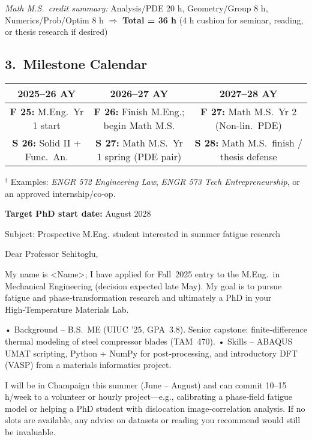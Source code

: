 \documentclass[12pt]{article}
\theoremstyle{definition} %
\theoremstyle{plain} %
\begin{document}
\noindent
\emph{Math M.S.\ credit summary:}\;
Analysis/PDE 20 h,\; Geometry/Group 8 h,\; Numerics/Prob/Optim 8 h
\quad$\Rightarrow$\quad
\textbf{Total = 36 h}  
(4 h cushion for seminar, reading, or thesis research if desired)

\subsection*{3.\ Milestone Calendar}

\begin{center}
\begin{tabular}{@{}ccc@{}}
\toprule
\textbf{2025--26 AY} & \textbf{2026--27 AY} & \textbf{2027--28 AY} \\ \midrule
\textbf{F 25:} M.Eng.\ Yr 1 start & \textbf{F 26:} Finish M.Eng.; begin Math M.S. &
\textbf{F 27:} Math M.S.\ Yr 2 (Non‑lin.\ PDE) \\[2pt]
\textbf{S 26:} Solid II + Func.\ An. &
\textbf{S 27:} Math M.S.\ Yr 1 spring (PDE pair) &
\textbf{S 28:} Math M.S.\ finish / thesis defense \\ \bottomrule
\end{tabular}
\end{center}

\bigskip
$^\dagger$ Examples: \textit{ENGR 572 Engineering Law},
\textit{ENGR 573 Tech Entrepreneurship}, or an approved internship/co‑op.

\medskip\noindent
\textbf{Target PhD start date:} August 2028

Subject: Prospective M.Eng. student interested in summer fatigue research

Dear Professor Sehitoglu,

My name is <Name>; I have applied for Fall 2025 entry to the
M.Eng. in Mechanical Engineering (decision expected late May).
My goal is to pursue fatigue and phase‑transformation research
and ultimately a PhD in your High‑Temperature Materials Lab.

• Background – B.S. ME (UIUC ’25, GPA 3.8).  Senior capstone: finite‑difference
  thermal modeling of steel compressor blades (TAM 470).  
• Skills – ABAQUS UMAT scripting, Python + NumPy for post‑processing,
  and introductory DFT (VASP) from a materials informatics project.

I will be in Champaign this summer (June – August) and can commit
10–15 h/week to a volunteer or hourly project—e.g., calibrating
a phase‑field fatigue model or helping a PhD student with dislocation
image‑correlation analysis.  If no slots are available, any advice on
datasets or reading you recommend would still be invaluable.
\end{document}
